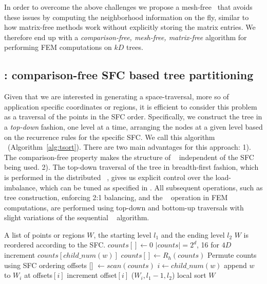 In order to overcome the above challenges we propose a mesh-free \mvec\ that avoids these issues by computing the neighborhood information on the fly, similar to how matrix-free methods work without explicitly storing the matrix entries. We therefore end up with a 
%
\textit{comparison-free, mesh-free, matrix-free} algorithm for performing FEM computations on $kD$ trees. 

\subsection{\tsort: comparison-free SFC based tree partitioning}
\label{subsec:tsort}
Given that we are interested in generating a space-traversal, more so of application specific coordinates or regions, it is efficient to consider this problem as a traversal of the points in the SFC order. Specifically, we construct the tree in a \textit{top-down} fashion, one level at a time, arranging the nodes at a given level based on the recurrence rules for the specific SFC. We call this algorithm \tsort ~(Algorithm~\ref{alg:tsort}). There are two main advantages for this approach: 1). The comparison-free property makes the structure of \tsort~ independent of the SFC being used\cite{FernandoDuplyakinSundar17}. 2). The top-down traversal of the tree in breadth-first fashion, which is performed in the distributed \tsort~, gives us explicit control over the  load-imbalance, which can be tuned as specified in \cite{FernandoSundar16}. All subsequent operations, such as tree construction, enforcing 2:1 balancing, and the \mvec~ operation in FEM computations, are performed using top-down and bottom-up traversals with slight variations of the sequential \tsort~ algorithm. 

\begin{algorithm}[t]
  \caption{\tsort}\label{alg:tsort}
  \footnotesize
  \begin{algorithmic}[1]
    \Require A list of points or regions $W$, the starting level $l_1$ and the ending level $l_2$
    \Ensure $W$ is reordered according to the SFC.
    \State $counts [] \leftarrow 0$
    \Comment $|counts| = 2^{d}$, 16 for $4D$
    \State increment $counts[child\_num(w)]$
    \EndFor
    \State $counts [] \leftarrow R_h(counts)$ 
    \Comment Permute counts using SFC ordering
    \State offsets [] $\leftarrow scan(counts)$
    \State $i\leftarrow child\_num(w)$
    \State append $w$ to $W_i$ at offsets$[i]$
    \State increment offset$[i]$
    \EndFor 
    \State \tsort ($W_i, l_1-1, l_2$)
    \Comment local sort
    \EndFor 
    \EndIf
    \State \Return $W$
  \end{algorithmic}
\end{algorithm}

